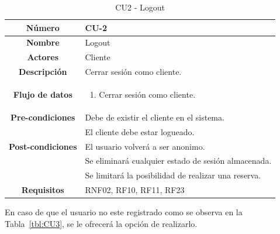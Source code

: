 \begin{table}[h!tb]
	\centering
	\begin{adjustbox}{width=1\textwidth}
	\begin{tabular}{|c|p{\textwidth}|}
		\hline {\bf Número} & CU-2 \\
		\hline {\bf Nombre} & Logout\\
		\hline {\bf Actores} & Cliente \\
		\hline {\bf Descripción} & Cerrar sesión como cliente. \\
		\hline {\bf Flujo de datos}
		& 
		\begin{enumerate}
			\item Cerrar sesión como cliente.
		\end{enumerate}\\
		\hline {\bf Pre-condiciones}
		& Debe de existir el cliente en el sistema. \\
        & El cliente debe estar logueado. \\
		\hline {\bf Post-condiciones}
		& El usuario volverá a ser anonimo. \\
        & Se eliminará cualquier estado de sesión almacenada. \\
        & Se limitará la posibilidad de realizar una reserva.\\
		\hline {\bf Requisitos} & RNF02, RF10, RF11, RF23 \\
		\hline 
	\end{tabular}
	\end{adjustbox}
	\caption{CU2 - Logout\label{tbl:CU2}}
\end{table}
En caso de que el usuario no este registrado como se observa en la Tabla~\ref{tbl:CU3}, se le ofrecerá la opción de realizarlo.
